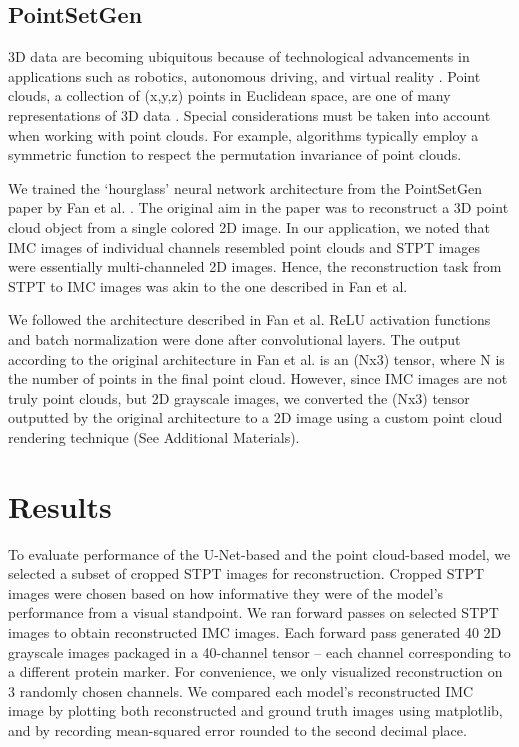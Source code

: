 \documentclass[10pt,twocolumn,letterpaper]{article}
\begin{document}
\subsection{PointSetGen}

3D data are becoming ubiquitous because of technological advancements in applications such as robotics, autonomous driving, and virtual reality \cite{wu_2020_pointconv}. Point clouds, a collection of (x,y,z) points in Euclidean space, are one of many representations of 3D data \cite{qi_2016_pointnet}. Special considerations must be taken into account when working with point clouds. For example, algorithms typically employ a symmetric function to respect the permutation invariance of point clouds. 

We trained the ‘hourglass’ neural network architecture from the PointSetGen paper by Fan et al. \cite{fan_2016_a}. The original aim in the paper was to reconstruct a 3D point cloud object from a single colored 2D image. In our application, we noted that IMC images of individual channels resembled point clouds and STPT images were essentially multi-channeled 2D images. Hence, the reconstruction task from STPT to IMC images was akin to the one described in Fan et al.
 
We followed the architecture described in Fan et al. ReLU activation functions and batch normalization were done after convolutional layers.  The output according to the original architecture in Fan et al. is an (Nx3) tensor, where N is the number of points in the final point cloud. However, since IMC images are not truly point clouds, but 2D grayscale images, we converted the (Nx3) tensor outputted by the original architecture to a 2D image using a custom point cloud rendering technique (See Additional Materials).

\section{Results}

To evaluate performance of the U-Net-based and the point cloud-based model, we selected a subset of cropped STPT images for reconstruction. Cropped STPT images were chosen based on how informative they were of the model’s performance from a visual standpoint. We ran forward passes on selected STPT images to obtain reconstructed IMC images. Each forward pass generated 40 2D grayscale images packaged in a 40-channel tensor – each channel corresponding to a different protein marker. For convenience, we only visualized reconstruction on 3 randomly chosen channels. We compared each model’s reconstructed IMC image by plotting both reconstructed and ground truth images using matplotlib, and by recording mean-squared error rounded to the second decimal place.
\end{document}
